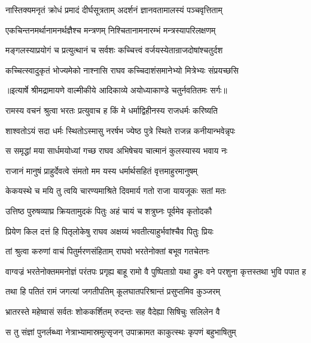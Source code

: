 \twolineshloka
{नास्तिक्यमनृतं क्रोधं प्रमादं दीर्घसूत्रताम्}
{अदर्शनं ज्ञानवतामालस्यं पञ्चवृत्तिताम्} %

\twolineshloka
{एकचिन्तनमर्थानामनर्थज्ञैश्च मन्त्रणम्}
{निश्चितानामनारम्भं मन्त्रस्यापरिलक्षणम्} %

\twolineshloka
{मङ्गलस्याप्रयोगं च प्रत्युत्थानं च सर्वशः}
{कच्चित्त्वं वर्जयस्येतान्राजदोषांश्चतुर्दश} %

\twolineshloka
{कच्चित्स्वादुकृतं भोज्यमेको नाश्नासि राघव}
{कच्चिदाशंसमानेभ्यो मित्रेभ्यः संप्रयच्छसि} %


{॥इत्यार्षे श्रीमद्रामायणे वाल्मीकीये आदिकाव्ये अयोध्याकाण्डे चतुर्नवतितमः सर्गः॥}


\twolineshloka
{रामस्य वचनं श्रुत्वा भरतः प्रत्युवाच ह}
{किं मे धर्माद्विहीनस्य राजधर्मः करिष्यति} %

\twolineshloka
{शाश्वतोऽयं सदा धर्मः स्थितोऽस्मासु नरर्षभ}
{ज्येष्ठ पुत्रे स्थिते राजन्न कनीयान्भवेन्नृपः} %

\twolineshloka
{स समृद्धां मया सार्धमयोध्यां गच्छ राघव}
{अभिषेचय चात्मानं कुलस्यास्य भवाय नः} %

\twolineshloka
{राजानं मानुषं प्राहुर्देवत्वे संमतो मम}
{यस्य धर्मार्थसहितं वृत्तमाहुरमानुषम्} %

\twolineshloka
{केकयस्थे च मयि तु त्वयि चारण्यमाश्रिते}
{दिवमार्य गतो राजा यायजूकः सतां मतः} %

\twolineshloka
{उत्तिष्ठ पुरुषव्याघ्र क्रियतामुदकं पितुः}
{अहं चायं च शत्रुघ्नः पूर्वमेव कृतोदकौ} %

\twolineshloka
{प्रियेण किल दत्तं हि पितृलोकेषु राघव}
{अक्षय्यं भवतीत्याहुर्भवांश्चैव पितुः प्रियः} %

\twolineshloka
{तां श्रुत्वा करुणां वाचं पितुर्मरणसंहिताम्}
{राघवो भरतेनोक्तां बभूव गतचेतनः} %

\threelineshloka
{वाग्वज्रं भरतेनोक्तममनोज्ञं परंतपः}
{प्रगृह्य बाहू रामो वै पुष्पिताग्रो यथा द्रुमः}
{वने परशुना कृत्तस्तथा भुवि पपात ह} %

\twolineshloka
{तथा हि पतितं रामं जगत्यां जगतीपतिम्}
{कूलघातपरिश्रान्तं प्रसुप्तमिव कुञ्जरम्} %

\twolineshloka
{भ्रातरस्ते महेष्वासं सर्वतः शोककर्शितम्}
{रुदन्तः सह वैदेह्या सिषिचुः सलिलेन वै} %

\twolineshloka
{स तु संज्ञां पुनर्लब्ध्वा नेत्राभ्यामास्रमुत्सृजन्}
{उपाक्रामत काकुत्स्थः कृपणं बहुभाषितुम्} %

